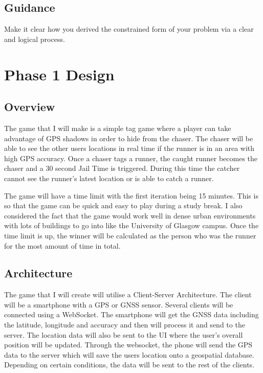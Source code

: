 \documentclass{l4proj}
\begin{document}
\section{Guidance}
Make it clear how you derived the constrained form of your problem via a clear and logical process. 

\chapter{Phase 1 Design}

\section{Overview}
\label{game-overview}
The game that I will make is a simple tag game where a player can take advantage of GPS shadows in order to hide from
the chaser. The chaser will be able to see the other users locations in real time if the runner is in an area with
high GPS accuracy. Once a chaser tags a runner, the caught runner becomes the chaser and a 30 second Jail Time is
triggered. During this time the catcher cannot see the runner's latest location or is able to catch a runner.

The game will have a time limit with the first iteration being 15 minutes. This is so that the game can be quick and
easy to play during a study break. I also considered the fact that the game would work well in dense urban environments
with lots of buildings to go into like the University of Glasgow campus. Once the time limit is up, the winner will
be calculated as the person who was the runner for the most amount of time in total.

\section{Architecture}
The game that I will create will utilise a Client-Server Architecture. The client will be a smartphone with a GPS or
GNSS sensor. Several clients will be connected using a WebSocket. The smartphone will get the GNSS data including the
latitude, longitude and accuracy and then will process it and send to the server. The location data will also be sent 
to the UI where the user's overall position will be updated. Through the websocket, the phone will send the GPS data
to the server which will save the users location onto a geospatial database. Depending on certain conditions, the data
will be sent to the rest of the clients.
\end{document}
